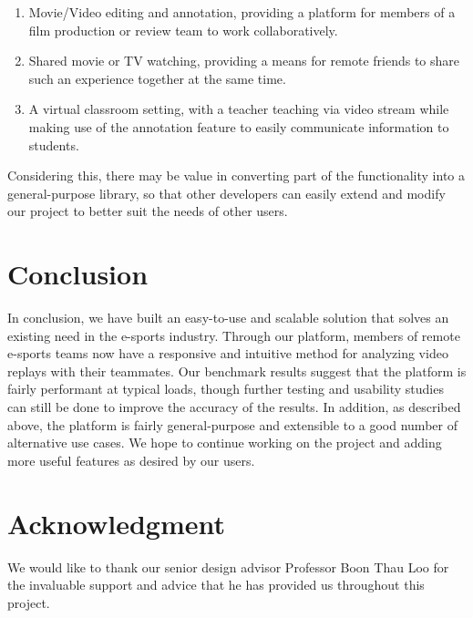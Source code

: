 \documentclass[conference]{IEEEtran}
\begin{document}
  \begin{enumerate}
      \item Movie/Video editing and annotation, providing a platform for members of a film production or review team to work collaboratively.

      \item Shared movie or TV watching, providing a means for remote friends to share such an experience together at the same time.

      \item A virtual classroom setting, with a teacher teaching via video stream while making use of the annotation feature to easily communicate information to students.
  \end{enumerate}

   Considering this, there may be value in converting part of the functionality into a general-purpose library, so that other developers can easily extend and modify our project to better suit the needs of other users.

\section{Conclusion}

  In conclusion, we have built an easy-to-use and scalable solution that solves an existing need in the e-sports industry. Through our platform, members of remote e-sports teams now have a responsive and intuitive method for analyzing video replays with their teammates. Our benchmark results suggest that the platform is fairly performant at typical loads, though further testing and usability studies can still be done to improve the accuracy of the results. In addition, as described above, the platform is fairly general-purpose and extensible to a good number of alternative use cases. We hope to continue working on the project and adding more useful features as desired by our users.

\section*{Acknowledgment}
We would like to thank our senior design advisor Professor Boon Thau Loo for the invaluable support and advice that he has provided us throughout this project.


\end{document}
